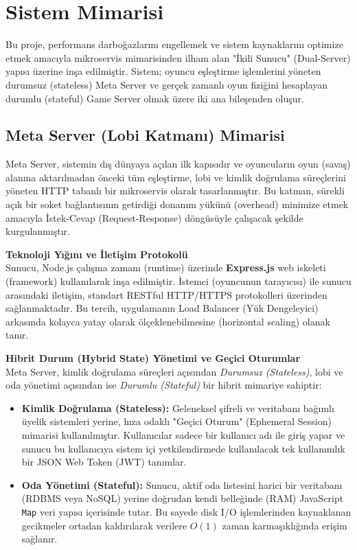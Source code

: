 \documentclass[12pt,a4paper]{article}
\begin{document}
\section{Sistem Mimarisi}
Bu proje, performans darboğazlarını engellemek ve sistem kaynaklarını optimize etmek amacıyla
mikroservis mimarisinden ilham alan "İkili Sunucu" (Dual-Server) yapısı üzerine inşa edilmiştir.
Sistem; oyuncu eşleştirme işlemlerini yöneten durumsuz (stateless) Meta Server ve gerçek zamanlı
oyun fiziğini hesaplayan durumlu (stateful) Game Server olmak üzere iki ana bileşenden oluşur.

\subsection{Meta Server (Lobi Katmanı) Mimarisi}

Meta Server, sistemin dış dünyaya açılan ilk kapısıdır ve oyuncuların oyun (savaş) alanına
aktarılmadan önceki tüm eşleştirme, lobi ve kimlik doğrulama süreçlerini yöneten HTTP tabanlı
bir mikroservis olarak tasarlanmıştır. Bu katman, sürekli açık bir soket bağlantısının getirdiği
donanım yükünü (overhead) minimize etmek amacıyla İstek-Cevap (Request-Response) döngüsüyle
çalışacak şekilde kurgulanmıştır.

\textbf{Teknoloji Yığını ve İletişim Protokolü} \\
Sunucu, Node.js çalışma zamanı (runtime) üzerinde \textbf{Express.js} web iskeleti (framework)
kullanılarak inşa edilmiştir. İstemci (oyuncunun tarayıcısı) ile sunucu arasındaki iletişim,
standart RESTful HTTP/HTTPS protokolleri üzerinden sağlanmaktadır. Bu tercih, uygulamanın
Load Balancer (Yük Dengeleyici) arkasında kolayca yatay olarak ölçeklenebilmesine (horizontal scaling)
olanak tanır.

\textbf{Hibrit Durum (Hybrid State) Yönetimi ve Geçici Oturumlar} \\
Meta Server, kimlik doğrulama süreçleri açısından \textit{Durumsuz (Stateless)}, lobi ve
oda yönetimi açısından ise \textit{Durumlu (Stateful)} bir hibrit mimariye sahiptir:
\begin{itemize}
      \item \textbf{Kimlik Doğrulama (Stateless):} Geleneksel şifreli ve veritabanı bağımlı
            üyelik sistemleri yerine, hıza odaklı "Geçici Oturum" (Ephemeral Session) mimarisi kullanılmıştır.
            Kullanıcılar sadece bir kullanıcı adı ile giriş yapar ve sunucu bu kullanıcıya sistem içi
            yetkilendirmede kullanılacak tek kullanımlık bir JSON Web Token (JWT) tanımlar.
      \item \textbf{Oda Yönetimi (Stateful):} Sunucu, aktif oda listesini harici bir veritabanı
            (RDBMS veya NoSQL) yerine doğrudan kendi belleğinde (RAM) JavaScript \texttt{Map}
            veri yapısı içerisinde tutar. Bu sayede disk I/O işlemlerinden kaynaklanan gecikmeler
            ortadan kaldırılarak verilere $O(1)$ zaman karmaşıklığında erişim sağlanır.
\end{itemize}
\end{document}
